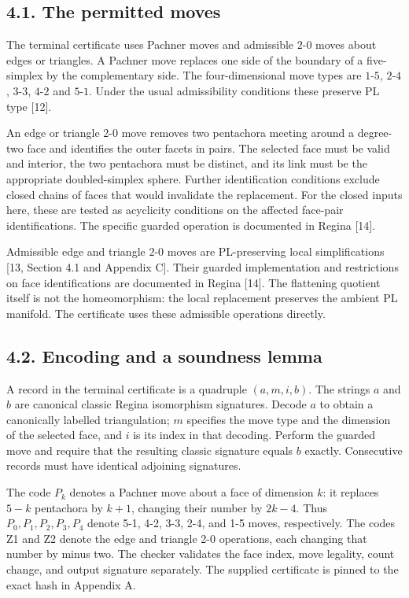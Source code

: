 \documentclass[11pt,letterpaper]{article}
\begin{document}
\subsection*{4.1. The permitted moves}
The terminal certificate uses Pachner moves and admissible $2$-$0$ moves about edges or triangles. A Pachner move replaces one side of the boundary of a five-simplex by the complementary side. The four-dimensional move types are $1$-$5$, $2$-$4$, $3$-$3$, $4$-$2$ and $5$-$1$. Under the usual admissibility conditions these preserve PL type [12].

An edge or triangle 2-0 move removes two pentachora meeting around a degree-two face and identifies the outer facets in pairs. The selected face must be valid and interior, the two pentachora must be distinct, and its link must be the appropriate doubled-simplex sphere. Further identification conditions exclude closed chains of faces that would invalidate the replacement. For the closed inputs here, these are tested as acyclicity conditions on the affected face-pair identifications. The specific guarded operation is documented in Regina [14].

Admissible edge and triangle $2$-$0$ moves are PL-preserving local simplifications [13, Section 4.1 and Appendix C]. Their guarded implementation and restrictions on face identifications are documented in Regina [14]. The flattening quotient itself is not the homeomorphism: the local replacement preserves the ambient PL manifold. The certificate uses these admissible operations directly.

\subsection*{4.2. Encoding and a soundness lemma}
A record in the terminal certificate is a quadruple $(a,m,i,b)$. The strings $a$ and $b$ are canonical classic Regina isomorphism signatures. Decode $a$ to obtain a canonically labelled triangulation; $m$ specifies the move type and the dimension of the selected face, and $i$ is its index in that decoding. Perform the guarded move and require that the resulting classic signature equals $b$ exactly. Consecutive records must have identical adjoining signatures.

The code $P_k$ denotes a Pachner move about a face of dimension $k$: it replaces $5-k$ pentachora by $k+1$, changing their number by $2k-4$. Thus $P_0,P_1,P_2,P_3,P_4$ denote 5-1, 4-2, 3-3, 2-4, and 1-5 moves, respectively. The codes Z1 and Z2 denote the edge and triangle 2-0 operations, each changing that number by minus two. The checker validates the face index, move legality, count change, and output signature separately. The supplied certificate is pinned to the exact hash in Appendix A.
\end{document}
